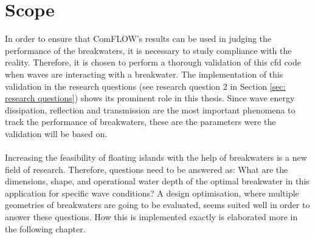 \section{Scope}
In order to ensure that ComFLOW's results can be used in judging the performance of the breakwaters, it is necessary to study compliance with the reality. Therefore, it is chosen to perform a thorough validation of this \acrshort{cfd} code when waves are interacting with a breakwater. The implementation of this validation in the research questions (see research question 2 in Section \ref{sec: research questions}) shows its prominent role in this thesis. Since wave energy dissipation, reflection and transmission are the most important phenomena to track the performance of breakwaters, these are the parameters were the validation will be based on. \\
\\

Increasing the feasibility of floating islands with the help of breakwaters is a new field of research. Therefore, questions need to be answered as: What are the dimensions, shape, and operational water depth of the optimal breakwater in this application for specific wave conditions? A design optimisation, where multiple geometries of breakwaters are going to be evaluated, seems suited well in order to answer these questions. How this is implemented exactly is elaborated more in the following chapter.
